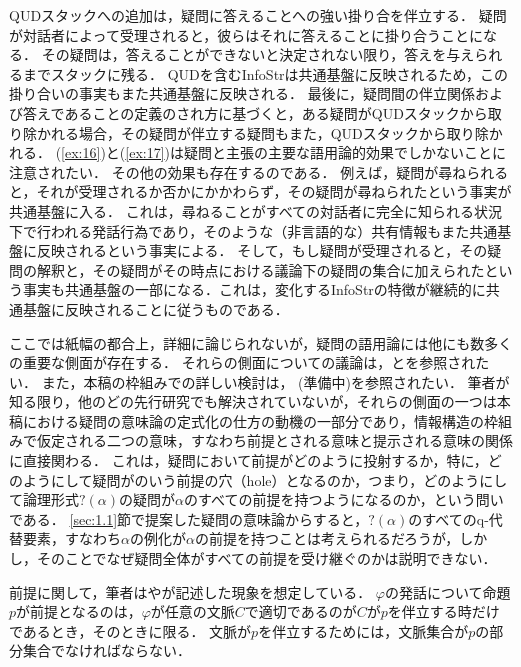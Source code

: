 \documentclass{goken}
\newcommand{\ori}[1]{\noindent\textcolor[gray]{0.7}{\fontsize{8pt}{8pt}\selectfont{\textsf{(p.~#1)}}} }
\begin{document}
\noindent
QUDスタックへの追加は，疑問に答えることへの強い掛り合を伴立する．
疑問が対話者によって受理されると，彼らはそれに答えることに掛り合うことになる．
その疑問は，答えることができないと決定されない限り，答えを与えられるまでスタックに残る．
QUDを含むInfoStrは共通基盤に反映されるため，この掛り合いの事実もまた共通基盤に反映される．
最後に，疑問間の伴立関係および答えであることの定義のされ方に基づくと，ある疑問がQUDスタックから取り除かれる場合，その疑問が伴立する疑問もまた，QUDスタックから取り除かれる．
(\ref{ex:16})と(\ref{ex:17})は疑問と主張の主要な語用論的効果でしかないことに注意されたい．
その他の効果も存在するのである．
\ori{23}
例えば，疑問が尋ねられると，それが受理されるか否かにかかわらず，その疑問が尋ねられたという事実が共通基盤に入る．
これは，尋ねることがすべての対話者に完全に知られる状況下で行われる発話行為であり，そのような（非言語的な）共有情報もまた共通基盤に反映されるという事実による．
そして，もし疑問が受理されると，その疑問の解釈と，その疑問がその時点における議論下の疑問の集合に加えられたという事実も共通基盤の一部になる．これは，変化するInfoStrの特徴が継続的に共通基盤に反映されることに従うものである．

ここでは紙幅の都合上，詳細に論じられないが，疑問の語用論には他にも数多くの重要な側面が存在する．
それらの側面についての議論は，\citet{GroenendijkStokhof1984}と\citet{Ginzburg1995a,Ginzburg1995b}を参照されたい．
また，本稿の枠組みでの詳しい検討は，\citeauthor{RobertsForthcoming} (準備中)を参照されたい．%
筆者が知る限り，他のどの先行研究でも解決されていないが，それらの側面の一つは本稿における疑問の意味論の定式化の仕方の動機の一部分であり，情報構造の枠組みで仮定される二つの意味，すなわち前提とされる意味と提示される意味の関係に直接関わる．
これは，疑問において前提がどのように投射するか，特に，どのようにして疑問が\citet{Karttunen1973}のいう前提の穴（hole）となるのか，つまり，どのようにして論理形式$?(\alpha)$の疑問が$\alpha$のすべての前提を持つようになるのか，という問いである．
\ref{sec:1.1}節で提案した疑問の意味論からすると，$?(\alpha)$のすべてのq-代替要素，すなわち$\alpha$の例化が$\alpha$の前提を持つことは考えられるだろうが，しかし，そのことでなぜ疑問全体がすべての前提を受け継ぐのかは説明できない．

前提に関して，筆者は\citet{Stalnaker1978}や\citet{Heim1992}が記述した現象を想定している．
$\varphi$の発話について命題$p$が前提となるのは，$\varphi$が任意の文脈$C$で適切であるのが$C$が$p$を伴立する時だけであるとき，そのときに限る．
文脈が$p$を伴立するためには，文脈集合が$p$の部分集合でなければならない．
\end{document}

